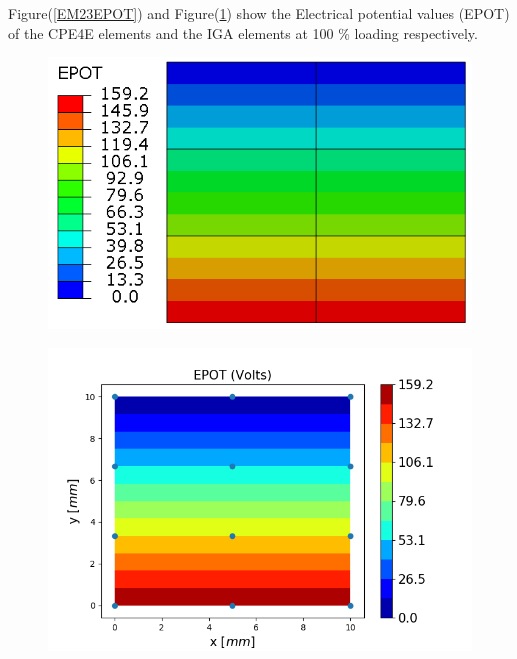 \documentclass[11pt]{article}
\begin{document}
Figure(\ref{EM23EPOT}) and Figure(\ref{EM23EPOT_IGA}) show the Electrical potential values (EPOT) of the CPE4E elements and the IGA elements at 100 \% loading respectively. \\
\begin{figure}[H]
	\centering
	\begin{minipage}{.5\textwidth}
		\centering
		\includegraphics[width=1\linewidth]{EM23EPOT.png}
		\label{EM23EPOT}
	\end{minipage}%
	\begin{minipage}{.6\textwidth}
		\centering
		\includegraphics[width=1\linewidth]{EM23EPOT_IGA.png}
		\label{EM23EPOT_IGA}
	\end{minipage}
\end{figure}
\end{document}
